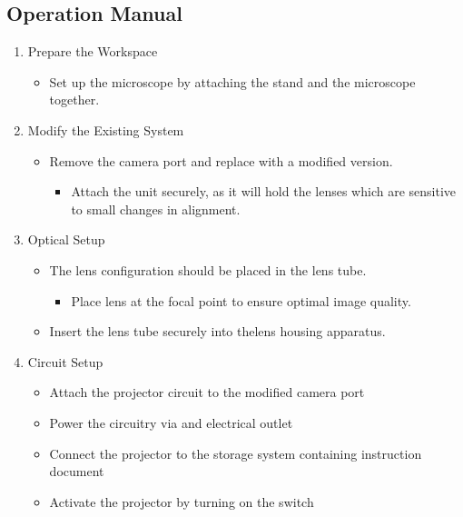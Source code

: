 \documentclass[12pt,a4paper]{article}
\begin{document}
\pagebreak
\begin{appendices}

\section{Operation Manual}

\begin{enumerate}
	\item Prepare the Workspace
	\begin{itemize}
		\item Set up the microscope by attaching the stand and the microscope together.
	\end{itemize}
	\item Modify the Existing System
	\begin{itemize}
		\item Remove the camera port and replace with a modified version.
		\begin{itemize}
			\item Attach the unit securely, as it will hold the lenses which are sensitive to small changes in alignment.
		\end{itemize}
	\end{itemize}
	
	\item Optical Setup
		\begin{itemize}
			\item The lens configuration should be placed in the lens tube.
			\begin{itemize}
				\item Place lens at the focal point to ensure optimal image quality.
			\end{itemize}
			\item Insert the lens tube securely into thelens housing apparatus.
		\end{itemize}
	
	\item Circuit Setup
		\begin{itemize}
			\item Attach the projector circuit to the modified camera port
			\item Power the circuitry via and electrical outlet
			\item Connect the projector to the storage system containing instruction document
			\item Activate the projector by turning on the switch
		\end{itemize}
	

\end{enumerate}
\end{appendices}
\end{document}
